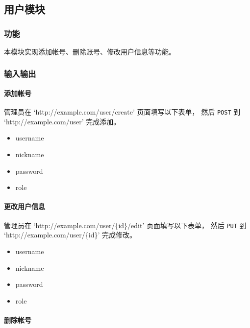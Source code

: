 \documentclass[a4paper,fancyhdr,fntef,hyperref]{ctexart}
\begin{document}
\subsection{用户模块}\label{ux7528ux6237ux6a21ux5757-1}

\subsubsection{功能}\label{ux529fux80fd-1}

本模块实现添加帐号、删除账号、修改用户信息等功能。

\subsubsection{输入输出}\label{ux8f93ux5165ux8f93ux51fa-1}

\paragraph{添加帐号}\label{ux6dfbux52a0ux5e10ux53f7-1}

管理员在 `http://example.com/user/create' 页面填写以下表单， 然后
\texttt{POST} 到 `http://example.com/user' 完成添加。

\begin{itemize}
\itemsep1pt\parskip0pt
\item
  username
\item
  nickname
\item
  password
\item
  role
\end{itemize}

\paragraph{更改用户信息}\label{ux66f4ux6539ux7528ux6237ux4fe1ux606f-1}

管理员在 `http://example.com/user/\{id\}/edit' 页面填写以下表单， 然后
\texttt{PUT} 到 `http://example.com/user/\{id\}' 完成修改。

\begin{itemize}
\itemsep1pt\parskip0pt
\item
  username
\item
  nickname
\item
  password
\item
  role
\end{itemize}

\paragraph{删除帐号}\label{ux5220ux9664ux5e10ux53f7-1}
\end{document}
